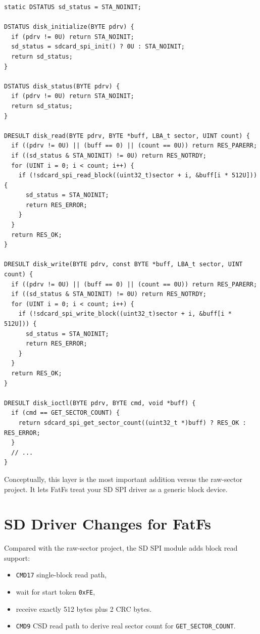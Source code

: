 \begin{lstlisting}[style=cstyle,caption={Core diskio mapping in this project}]
static DSTATUS sd_status = STA_NOINIT;

DSTATUS disk_initialize(BYTE pdrv) {
  if (pdrv != 0U) return STA_NOINIT;
  sd_status = sdcard_spi_init() ? 0U : STA_NOINIT;
  return sd_status;
}

DSTATUS disk_status(BYTE pdrv) {
  if (pdrv != 0U) return STA_NOINIT;
  return sd_status;
}

DRESULT disk_read(BYTE pdrv, BYTE *buff, LBA_t sector, UINT count) {
  if ((pdrv != 0U) || (buff == 0) || (count == 0U)) return RES_PARERR;
  if ((sd_status & STA_NOINIT) != 0U) return RES_NOTRDY;
  for (UINT i = 0; i < count; i++) {
    if (!sdcard_spi_read_block((uint32_t)sector + i, &buff[i * 512U])) {
      sd_status = STA_NOINIT;
      return RES_ERROR;
    }
  }
  return RES_OK;
}

DRESULT disk_write(BYTE pdrv, const BYTE *buff, LBA_t sector, UINT count) {
  if ((pdrv != 0U) || (buff == 0) || (count == 0U)) return RES_PARERR;
  if ((sd_status & STA_NOINIT) != 0U) return RES_NOTRDY;
  for (UINT i = 0; i < count; i++) {
    if (!sdcard_spi_write_block((uint32_t)sector + i, &buff[i * 512U])) {
      sd_status = STA_NOINIT;
      return RES_ERROR;
    }
  }
  return RES_OK;
}

DRESULT disk_ioctl(BYTE pdrv, BYTE cmd, void *buff) {
  if (cmd == GET_SECTOR_COUNT) {
    return sdcard_spi_get_sector_count((uint32_t *)buff) ? RES_OK : RES_ERROR;
  }
  // ...
}
\end{lstlisting}

\noindent
Conceptually, this layer is the most important addition versus the raw-sector project.
It lets FatFs treat your SD SPI driver as a generic block device.

\section{SD Driver Changes for FatFs}

Compared with the raw-sector project, the SD SPI module adds block read support:
\begin{itemize}[leftmargin=*]
\item \texttt{CMD17} single-block read path,
\item wait for start token \texttt{0xFE},
\item receive exactly 512 bytes plus 2 CRC bytes.
\item \texttt{CMD9} CSD read path to derive real sector count for \texttt{GET\_SECTOR\_COUNT}.
\end{itemize}

